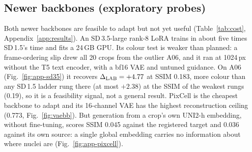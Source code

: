 \subsection{Newer backbones (exploratory probes)}
Both newer backbones are feasible to adapt but not yet useful (Table~\ref{tab:cost}, Appendix~\ref{app:results}). An SD\,3.5-large
rank-8 LoRA trains in about five times SD\,1.5's time and fits a 24\,GB GPU. Its colour test is weaker than
planned: a frame-ordering slip drew all 20 crops from the outlier A06, and it ran at 1024\,px without the T5
text encoder, with a bf16 VAE and untuned guidance. On A06 (Fig.~\ref{fig:app-sd35}) it recovers $\Delta_{\mathrm{LAB}}=+4.77$ at SSIM 0.183, more
colour than any SD\,1.5 ladder rung there (at most $+2.38$) at the SSIM of the weakest rungs (0.19), so it is a
feasibility signal, not a general result.
PixCell is the cheapest backbone to adapt and its 16-channel VAE has the highest reconstruction ceiling
(0.773, Fig.~\ref{fig:vaebb}). But generation from a crop's own UNI2-h embedding, without fine-tuning,
scores SSIM 0.045 against the registered target and 0.036 against its own source: a single global embedding
carries no information about where nuclei are (Fig.~\ref{fig:app-pixcell}).
